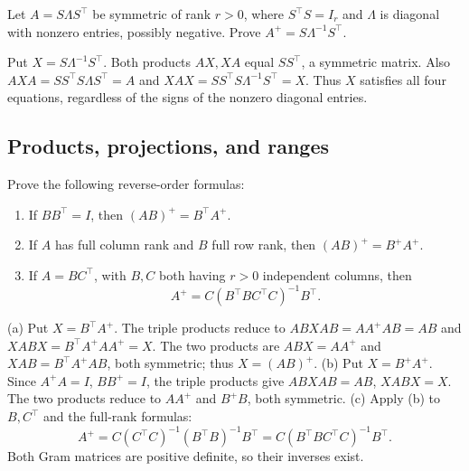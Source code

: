 \begin{problem}\label{ex:10:symmetric-inverse}
Let \(A=S\Lambda S^\top\) be symmetric of rank \(r>0\), where
\(S^\top S=I_r\) and \(\Lambda\) is diagonal with nonzero entries,
possibly negative. Prove \(A^+=S\Lambda^{-1}S^\top\).
\end{problem}
\begin{solution}
Put \(X=S\Lambda^{-1}S^\top\). Both products \(AX,XA\) equal
\(SS^\top\), a symmetric matrix. Also
\(AXA=SS^\top S\Lambda S^\top=A\) and
\(XAX=SS^\top S\Lambda^{-1}S^\top=X\).
Thus \(X\) satisfies all four equations, regardless of the signs of the
nonzero diagonal entries.
\end{solution}

\subsection*{Products, projections, and ranges}

\begin{problem}\label{ex:10:reverse-order}
Prove the following reverse-order formulas:
\begin{enumerate}
\item If \(BB^\top=I\), then \((AB)^+=B^\top A^+\).
\item If \(A\) has full column rank and \(B\) full row rank, then
\((AB)^+=B^+A^+\).
\item If \(A=BC^\top\), with \(B,C\) both having \(r>0\) independent
columns, then
\[A^+=C(B^\top BC^\top C)^{-1}B^\top.\]
\end{enumerate}
\end{problem}
\begin{solution}
(a) Put \(X=B^\top A^+\). The triple products reduce to
\(ABXAB=AA^+AB=AB\) and \(XABX=B^\top A^+AA^+=X\).
The two products are \(ABX=AA^+\) and \(XAB=B^\top A^+AB\),
both symmetric; thus \(X=(AB)^+\).
(b) Put \(X=B^+A^+\). Since \(A^+A=I\), \(BB^+=I\), the triple
products give \(ABXAB=AB\), \(XABX=X\). The two products reduce to
\(AA^+\) and \(B^+B\), both symmetric.
(c) Apply (b) to \(B,C^\top\) and the full-rank formulas:
\[
A^+=C(C^\top C)^{-1}(B^\top B)^{-1}B^\top
=C(B^\top BC^\top C)^{-1}B^\top.
\]
Both Gram matrices are positive definite, so their inverses exist.
\end{solution}

